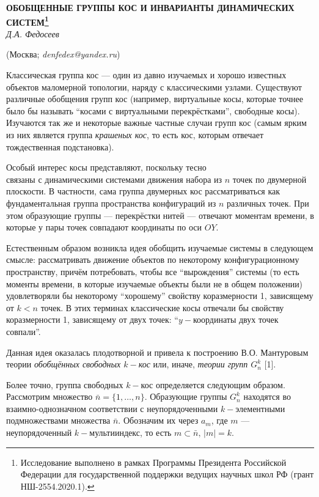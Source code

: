 \begin{center}
    {\bf ОБОБЩЕННЫЕ ГРУППЫ КОС И ИНВАРИАНТЫ ДИНАМИЧЕСКИХ СИСТЕМ\footnote{Исследование выполнено в рамках Программы Президента Российской Федерации для государственной поддержки ведущих научных школ РФ (грант НШ-2554.2020.1).}}\\

    {\it Д.А. Федосеев}

    (Москва; {\it denfedex@yandex.ru})
\end{center}


Классическая группа кос --- один из давно изучаемых и хорошо известных объектов маломерной топологии, наряду с классическими узлами. Существуют различные обобщения групп кос (например, виртуальные косы, которые точнее было бы называть ``косами с виртуальными перекрёстками'', свободные косы). Изучаются так же и некоторые важные частные случаи групп кос (самым ярким из них является группа {\em крашеных кос}, то есть кос, которым отвечает тождественная подстановка).

Особый интерес косы представляют, поскольку тесно
\\связаны с динамическими системами движения набора из $n$ точек по двумерной плоскости. В частности, сама группа двумерных кос рассматриваться как фундаментальная группа пространства конфигураций из $n$ различных точек. При этом образующие группы --- перекрёстки нитей --- отвечают моментам времени, в которые у пары точек совпадают координаты по оси $OY$.

Естественным образом возникла идея обобщить изучаемые системы в следующем смысле: рассматривать движение объектов по некоторому конфигурационному пространству, причём потребовать, чтобы все ``вырождения'' системы (то есть моменты времени, в которые изучаемые объекты были не в общем положении) удовлетворяли бы некоторому ``хорошему'' свойству коразмерности 1, зависящему от $k<n$ точек. В этих терминах классические косы отвечали бы свойству коразмерности 1, зависящему от двух точек: ``$y-$координаты двух точек совпали''.

Данная идея оказалась плодотворной и привела к построению В.О. Мантуровым теории {\em обобщённых свободных $k-$кос} или, иначе, {\em теории групп $G_n^k$} [1].

Более точно, группа свободных $k-$кос определяется следующим образом. Рассмотрим множество $\bar{n}=\{1,\dots, n\}$. Образующие группы $G_n^k$ находятся во взаимно-однозначном соответствии с неупорядоченными $k-$элементными подмножествами множества $\bar{n}$. Обозначим их через $a_m$, где $m$ --- неупорядоченный $k-$мультииндекс, то есть $m\subset \bar{n}, \, |m|=k$.

